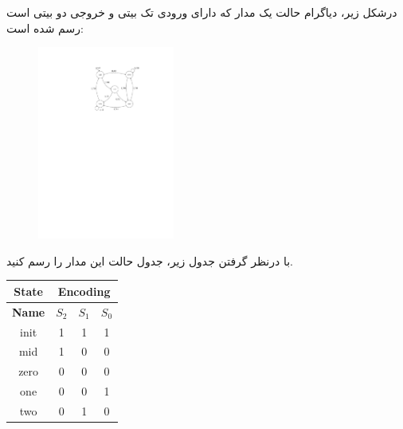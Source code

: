 

درشکل زیر، دیاگرام حالت یک مدار که دارای ورودی تک بیتی و خروجی دو بیتی است رسم شده است:

\begin{figure}[h]
	\centering
	\includegraphics[width=0.4\textwidth]{fig/Q_basic8_.pdf}
	\label{fig:Q_basic_8}
\end{figure}



با درنظر گرفتن جدول زیر، جدول حالت این مدار را رسم کنید.

\begin{latin}
	\begin{table}[h!]
		\centering
		\begin{tabular}{|c|c|c|c|}
			\hline
			\textbf{State} & \multicolumn{3}{|c|}{\textbf{Encoding}} \\ \hline
			\textbf{Name} & $S_2$ & $S_1$ & $S_0$ \\ \hline
			init          & 1     & 1     & 1     \\ \hline
			mid           & 1     & 0     & 0     \\ \hline
			zero          & 0     & 0     & 0     \\ \hline
			one           & 0     & 0     & 1     \\ \hline
			two           & 0     & 1     & 0     \\ \hline
		\end{tabular}
	\end{table}
\end{latin}
